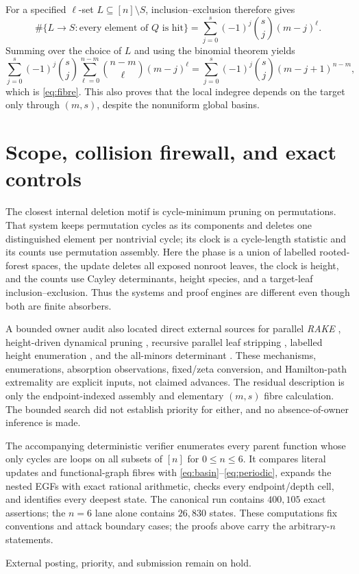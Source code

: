 \documentclass[10pt,a4paper]{amsart}
\theoremstyle{definition}
\begin{document}
For a specified $\ell$-set $L\subseteq[n]\setminus S$, inclusion--exclusion
therefore gives
\[
 \#\{L\to S:\text{every element of }Q\text{ is hit}\}
 =\sum_{j=0}^{s}(-1)^j\binom sj(m-j)^\ell.                    \tag{4.1}
\]
Summing over the choice of $L$ and using the binomial theorem yields
\[
 \sum_{j=0}^{s}(-1)^j\binom sj
 \sum_{\ell=0}^{n-m}\binom{n-m}{\ell}(m-j)^\ell
 =\sum_{j=0}^{s}(-1)^j\binom sj(m-j+1)^{n-m},
\]
which is \eqref{eq:fibre}.  This also proves that the local indegree depends on
the target only through $(m,s)$, despite the nonuniform global basins.

\section{Scope, collision firewall, and exact controls}

The closest internal deletion motif is cycle-minimum pruning on permutations.
That system keeps permutation cycles as its components and deletes one
distinguished element per nontrivial cycle; its clock is a cycle-length
statistic and its counts use permutation assembly.  Here the phase is a
union of labelled rooted-forest spaces, the update deletes all exposed
nonroot leaves, the clock is height, and the counts use Cayley determinants,
height species, and a target-leaf inclusion--exclusion.  Thus the systems and
proof engines are different even though both are finite absorbers.

A bounded owner audit also located direct external sources for parallel
\emph{RAKE} \cite{MillerReif1985}, height-driven dynamical pruning
\cite{KovchegovZaliapin2020}, recursive parallel leaf stripping
\cite{AddarioBerryEtAl2025}, labelled height enumeration
\cite{Riordan1960,RenyiSzekeres1967}, and the all-minors determinant
\cite{Chaiken1982}.  These mechanisms, enumerations, absorption observations,
fixed/zeta conversion, and Hamilton-path extremality are explicit inputs, not
claimed advances.  The residual description is only the endpoint-indexed
assembly and elementary $(m,s)$ fibre calculation.  The bounded search did
not establish priority for either, and no absence-of-owner inference is made.

The accompanying deterministic verifier enumerates every parent function
whose only cycles are loops on all subsets of $[n]$ for $0\leq n\leq6$.
It compares literal updates and functional-graph fibres with
\eqref{eq:basin}--\eqref{eq:periodic}, expands the nested EGFs with exact rational
arithmetic, checks every endpoint/depth cell, and identifies every deepest
state.  The canonical run contains $400{,}105$ exact assertions; the $n=6$ lane alone
contains $26{,}830$ states.  These computations fix conventions and attack
boundary cases; the proofs above carry the arbitrary-$n$ statements.

External posting, priority, and submission remain on hold.



\end{document}
